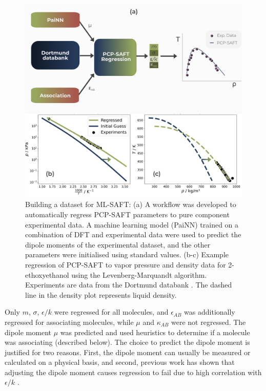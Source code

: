 \begin{figure}
    \centering
    \includegraphics[width=\textwidth]{gfx/Chapter08/deepsaft_regression.png}
    \caption{Building a dataset for ML-SAFT: (a) A workflow was developed to automatically regress PCP-SAFT parameters to pure component experimental data. A machine learning model (PaiNN) trained on  a combination of DFT and experimental data were used to predict the dipole moments of the experimental dataset, and the other parameters were initialised using standard values. (b-c) Example regression of PCP-SAFT to vapor pressure and density data for 2-ethoxyethanol using the Levenberg-Marquandt algorithm. Experiments are data from the Dortmund databank \cite{dortmunddatabank}. The dashed line in the density plot represents liquid density.}
    \label{fig:ML-SAFT_regression}
\end{figure}

Only $m$, $\sigma$, $\epsilon/k$ were regressed for all molecules, and $\epsilon_{AB}$ was additionally regressed for associating molecules, while $\mu$ and $\kappa_{AB}$ were not regressed. The dipole moment $\mu$ was predicted and used heuristics to determine if a molecule was associating (described below). The choice to predict the dipole moment is justified for two reasons. First, the dipole moment can usually be measured or calculated on a physical basis, and second, previous work has shown that adjusting the dipole moment causes regression to fail due to high correlation with $\epsilon/k$ \cite{Cripwell2017, deVilliers2011}. 

